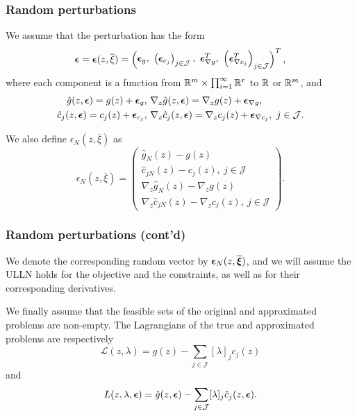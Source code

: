 \documentclass[aspectratio=169]{beamer}
\begin{document}
\begin{frame}
\frametitle{Random perturbations}

We assume that the perturbation has the form
\[
\bsepsilon = \bsepsilon(z,\overline{\xi}) =
\begin{pmatrix} \bsepsilon_g,\
\left( \bsepsilon_{c_j} \right)_{j \in \mathcal{J}},\ 
\bsepsilon^T_{\nabla g},\ 
\left( \bsepsilon^T_{\nabla c_j} \right)_{j \in \mathcal{J}}
\end{pmatrix}^T,
\]
where each component is a function from $\mathbb{R}^m \times \prod_{i = 1}^{\infty} \mathbb{R}^r$ to $\mathbb{R}$ or $\mathbb{R}^m$, and
\[
\begin{aligned}
\hat{g} (z, {\boldsymbol{\epsilon}}) = g(z) + {\boldsymbol{\epsilon}}_g,\ &
\nabla_z \hat{g} (z, {\boldsymbol{\epsilon}}) = \nabla_z g(z) +
{\boldsymbol{\epsilon}}_{\nabla g}, \\
\hat{c}_j (z, {\boldsymbol{\epsilon}}) = c_j(z) +
{\boldsymbol{\epsilon}}_{c_j},\ &
\nabla_z \hat{c}_j (z, {\boldsymbol{\epsilon}}) = \nabla_z c_j(z) +
{\boldsymbol{\epsilon}}_{\nabla c_j},\ j \in \mathcal{J}.
\end{aligned}
\]

\mbox{}

We also define $\epsilon_N (z, \overline{\xi} )$ as
\[
\epsilon_N(z, \overline{\xi}) = \begin{pmatrix} \hat{g}_N(z)-g(z) \\
\hat{c}_{jN}(z)-c_j(z),\ j \in \mathcal{J}\\
\nabla_z \hat{g}_N(z) -
\nabla_z g(z)\\
\nabla_z \hat{c}_{jN}(z)- \nabla_z c_j(z),\ j \in \mathcal{J} \end{pmatrix}.
\]

\end{frame}

\begin{frame}
\frametitle{Random perturbations (cont'd)}

We denote the corresponding random vector by ${\boldsymbol{\epsilon}}_N (z, \overline{{\boldsymbol{\xi}}} )$, and we will assume the ULLN holds for the objective and 
the constraints, as well as for their corresponding derivatives.

\mbox{}

We finally assume that the feasible sets of the original and approximated problems are non-empty.
The Lagrangians of the true and approximated problems are respectively
\[
\mathcal{L}(z, \lambda) = g(z) - \sum_{j \in \mathcal{J}} [\lambda]_j c_j(z)
\]
and
\[
L(z, \lambda, {\boldsymbol{\epsilon}}) = \hat{g}(z,
{\boldsymbol{\epsilon}}) - \sum_{j \in \mathcal{J}} [\lambda]_j \hat{c}_j(z,
{\boldsymbol{\epsilon}}).
\]

\end{frame}
\end{document}
